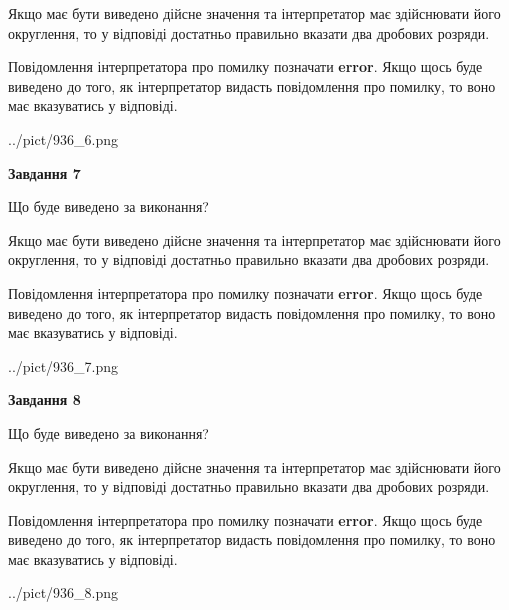 \documentclass[12pt, ukrainian]{article}
\begin{document}
{\begin {Large}
Якщо має бути виведено дійсне значення та інтерпретатор має здійснювати його округлення, 
то у відповіді достатньо правильно вказати два дробових розряди.

Повідомлення інтерпретатора про помилку позначати \textbf{error}.
Якщо щось буде виведено до того, як інтерпретатор видасть повідомлення про помилку, 
то воно має вказуватись у відповіді. \par

\begin{center}
	{../pict/936_6.png}
\end{center}
\newpage

{\begin {center}\textbf{Завдання 7}\end {center}}\par
Що буде виведено за виконання? \par

Якщо має бути виведено дійсне значення та інтерпретатор має здійснювати його округлення, 
то у відповіді достатньо правильно вказати два дробових розряди.

Повідомлення інтерпретатора про помилку позначати \textbf{error}.
Якщо щось буде виведено до того, як інтерпретатор видасть повідомлення про помилку, 
то воно має вказуватись у відповіді. \par

\begin{center}
	{../pict/936_7.png}
\end{center}
\newpage

{\begin {center}\textbf{Завдання 8}\end {center}}\par
Що буде виведено за виконання? \par

Якщо має бути виведено дійсне значення та інтерпретатор має здійснювати його округлення, 
то у відповіді достатньо правильно вказати два дробових розряди.

Повідомлення інтерпретатора про помилку позначати \textbf{error}.
Якщо щось буде виведено до того, як інтерпретатор видасть повідомлення про помилку, 
то воно має вказуватись у відповіді. \par

\begin{center}
	{../pict/936_8.png}
\end{center}
\newpage


\end{Large}}
\end{document}
